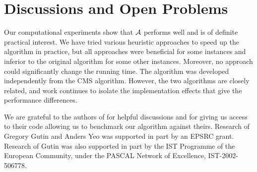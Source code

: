 \documentclass[11pt]{article}
\newcommand{\2}{\vspace{0.2 cm}}
\begin{document}
\section{Discussions and Open Problems}\label{discsec}



Our computational experiments show that $\cal A$ performs well and
is of definite practical interest. We have tried various heuristic
approaches to speed up the algorithm in practice, but all approaches
were beneficial for some instances and inferior to the original
algorithm for some other instances. Moreover, no approach could
significantly change the running time. The algorithm was developed
independently from the CMS algorithm. However, the two algorithms
are closely related, and work continues to isolate the
implementation effects that give the performance differences.


\2 \2

  We are grateful to the authors of
\cite{chen} for helpful discussions and for giving us access to
their code allowing us to benchmark our algorithm against theirs.
Research of Gregory Gutin and Anders Yeo was supported in part by an
EPSRC grant. Research of Gutin was also supported in part by the IST
Programme of the European Community, under the PASCAL Network of
Excellence, IST-2002-506778.
\end{document}
